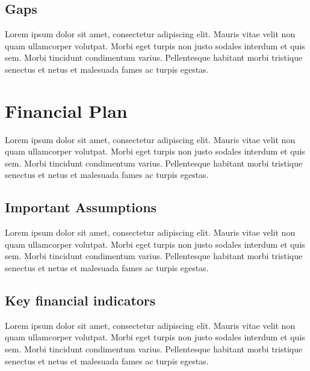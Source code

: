 \documentclass[11pt,a4paper,titlepage]{article}
\begin{document}
\subsection{Gaps}
Lorem ipsum dolor sit amet, consectetur adipiscing elit. Mauris vitae velit 
non quam ullamcorper volutpat. Morbi eget turpis non justo sodales interdum 
et quis sem. Morbi tincidunt condimentum varius. Pellentesque habitant morbi 
tristique senectus et netus et malesuada fames ac turpis egestas.\newline
\pagebreak

\section{Financial Plan}
Lorem ipsum dolor sit amet, consectetur adipiscing elit. Mauris vitae velit 
non quam ullamcorper volutpat. Morbi eget turpis non justo sodales interdum 
et quis sem. Morbi tincidunt condimentum varius. Pellentesque habitant morbi 
tristique senectus et netus et malesuada fames ac turpis egestas.\newline

\subsection{Important Assumptions}
Lorem ipsum dolor sit amet, consectetur adipiscing elit. Mauris vitae velit 
non quam ullamcorper volutpat. Morbi eget turpis non justo sodales interdum 
et quis sem. Morbi tincidunt condimentum varius. Pellentesque habitant morbi 
tristique senectus et netus et malesuada fames ac turpis egestas.\newline

\subsection{Key financial indicators}
Lorem ipsum dolor sit amet, consectetur adipiscing elit. Mauris vitae velit 
non quam ullamcorper volutpat. Morbi eget turpis non justo sodales interdum 
et quis sem. Morbi tincidunt condimentum varius. Pellentesque habitant morbi 
tristique senectus et netus et malesuada fames ac turpis egestas.\newline
\end{document}
